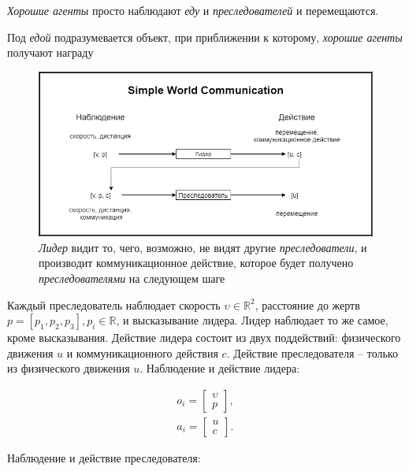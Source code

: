 \textit{Хорошие агенты} просто наблюдают \textit{еду} и \textit{преследователей} и перемещаются.

Под \textit{едой} подразумевается объект, при приближении к которому, \textit{хорошие агенты} получают награду

\begin{figure}[ht!]
    \center
    \includegraphics [scale=0.60] {my_folder/images/ch4/simple_world_communication.png}
    \caption{\textit{Лидер} видит то, чего, возможно, не видят другие \textit{преследователи}, и производит коммуникационное действие, которое будет получено \textit{преследователями} на следующем шаге}
    \label{fig:exp-swc}
\end{figure}

Каждый преследователь наблюдает скорость $\upsilon \in \mathbb{R}^2$, расстояние до жертв $p = [p_1, p_2, p_3], p_i \in \mathbb{R}$, и высказывание лидера. Лидер наблюдает то же самое, кроме высказывания. Действие лидера состоит из двух поддействий: физического движения $u$ и коммуникационного действия $c$. Действие преследователя – только из физического движения $u$.
Наблюдение и действие лидера:

\begin{equation}
    \begin{multlined}
        o_i = \begin{bmatrix}
                  \upsilon \\ p
        \end{bmatrix}, \\
        a_i = \begin{bmatrix}
                  u \\ c
        \end{bmatrix}.
    \end{multlined}
\end{equation}

Наблюдение и действие преследователя:

